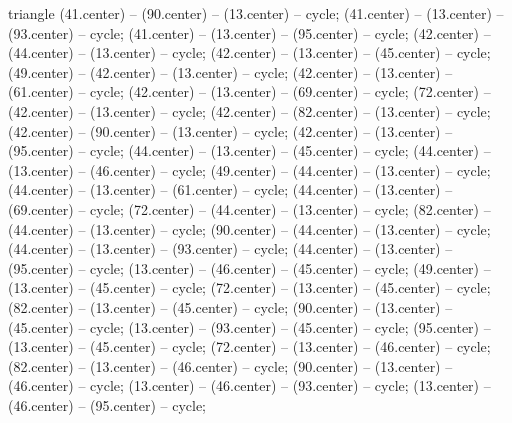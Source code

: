 \begin{pgfonlayer}{triangle}
 (41.center) -- (90.center) -- (13.center) -- cycle; 
 (41.center) -- (13.center) -- (93.center) -- cycle; 
 (41.center) -- (13.center) -- (95.center) -- cycle; 
 (42.center) -- (44.center) -- (13.center) -- cycle; 
 (42.center) -- (13.center) -- (45.center) -- cycle; 
 (49.center) -- (42.center) -- (13.center) -- cycle; 
 (42.center) -- (13.center) -- (61.center) -- cycle; 
 (42.center) -- (13.center) -- (69.center) -- cycle; 
 (72.center) -- (42.center) -- (13.center) -- cycle; 
 (42.center) -- (82.center) -- (13.center) -- cycle; 
 (42.center) -- (90.center) -- (13.center) -- cycle; 
 (42.center) -- (13.center) -- (95.center) -- cycle; 
 (44.center) -- (13.center) -- (45.center) -- cycle; 
 (44.center) -- (13.center) -- (46.center) -- cycle; 
 (49.center) -- (44.center) -- (13.center) -- cycle; 
 (44.center) -- (13.center) -- (61.center) -- cycle; 
 (44.center) -- (13.center) -- (69.center) -- cycle; 
 (72.center) -- (44.center) -- (13.center) -- cycle; 
 (82.center) -- (44.center) -- (13.center) -- cycle; 
 (90.center) -- (44.center) -- (13.center) -- cycle; 
 (44.center) -- (13.center) -- (93.center) -- cycle; 
 (44.center) -- (13.center) -- (95.center) -- cycle; 
 (13.center) -- (46.center) -- (45.center) -- cycle; 
 (49.center) -- (13.center) -- (45.center) -- cycle; 
 (72.center) -- (13.center) -- (45.center) -- cycle; 
 (82.center) -- (13.center) -- (45.center) -- cycle; 
 (90.center) -- (13.center) -- (45.center) -- cycle; 
 (13.center) -- (93.center) -- (45.center) -- cycle; 
 (95.center) -- (13.center) -- (45.center) -- cycle; 
 (72.center) -- (13.center) -- (46.center) -- cycle; 
 (82.center) -- (13.center) -- (46.center) -- cycle; 
 (90.center) -- (13.center) -- (46.center) -- cycle; 
 (13.center) -- (46.center) -- (93.center) -- cycle; 
 (13.center) -- (46.center) -- (95.center) -- cycle; 

\end{pgfonlayer}
